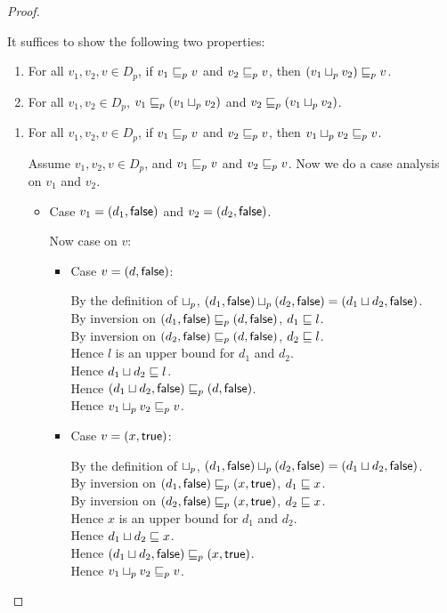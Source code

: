 \begin{proof}
\begin{enumerate}
It suffices to show the following two properties:
  \begin{enumerate}
  \item For all $v_1, v_2, v \in D_p$, if $v_1 \sqsubseteq_p v$ and $v_2 \sqsubseteq_p v$, then $(v_1 \sqcup_p v_2) \sqsubseteq_p v$.
  \item For all $v_1, v_2 \in D_p$, $v_1 \sqsubseteq_p (v_1 \sqcup_p v_2)$ and $v_2 \sqsubseteq_p (v_1 \sqcup_p v_2)$. 
  \end{enumerate}
  \begin{enumerate}
  \item For all $v_1, v_2, v \in D_p$, if $v_1 \sqsubseteq_p v$ and $v_2 \sqsubseteq_p v$, then $v_1 \sqcup_p v_2 \sqsubseteq_p v$.
    
   Assume $v_1, v_2, v \in D_p$, and $v_1 \sqsubseteq_p v$ and $v_2 \sqsubseteq_p v$. Now we do a case analysis on 
   $v_1$ and $v_2$. 
   \begin{itemize}
   \item Case $v_1 = (d_1, \textsf{false})$ and $v_2 = (d_2, \textsf{false})$. 
  
     Now case on $v$: 
     \begin{itemize}
     \item Case $v = (d, \textsf{false})$: 
  
       By the definition of $ \sqcup_p $, $(d_1, \textsf{false}) \sqcup_p (d_2, \textsf{false}) = (d_1 \sqcup d_2, \textsf{false})$. \\ 
       By inversion on $(d_1, \textsf{false}) \sqsubseteq_p (d, \textsf{false})$,  $d_1 \sqsubseteq l$. \\
       By inversion on $(d_2, \textsf{false}) \sqsubseteq_p (d, \textsf{false})$,  $d_2 \sqsubseteq l$. \\
       Hence $l$ is an upper bound for $d_1$ and $d_2$. \\ 
       Hence $d_1 \sqcup d_2 \sqsubseteq l$. \\ 
       Hence $(d_1 \sqcup d_2, \textsf{false}) \sqsubseteq_p (d, \textsf{false})$. \\ 
       Hence $v_1 \sqcup_p v_2 \sqsubseteq_p v$. 
  
     \item Case $v = (x, \textsf{true})$: 
  
       By the definition of $ \sqcup_p $, $(d_1, \textsf{false})  \sqcup_p  (d_2, \textsf{false}) = (d_1 \sqcup d_2, \textsf{false})$. \\ 
       By inversion on $(d_1, \textsf{false}) \sqsubseteq_p (x, \textsf{true})$,  $d_1 \sqsubseteq x$. \\
       By inversion on $(d_2, \textsf{false}) \sqsubseteq_p (x, \textsf{true})$,  $d_2 \sqsubseteq x$. \\
       Hence $x$ is an upper bound for $d_1$ and $d_2$. \\ 
       Hence $d_1 \sqcup d_2 \sqsubseteq x$. \\ 
       Hence $(d_1 \sqcup d_2, \textsf{false}) \sqsubseteq_p (x, \textsf{true})$. \\ 
       Hence $v_1 \sqcup_p v_2 \sqsubseteq_p v$. 
     \end{itemize}
  

\end{itemize}
\end{enumerate}
\end{enumerate}
\end{proof}
